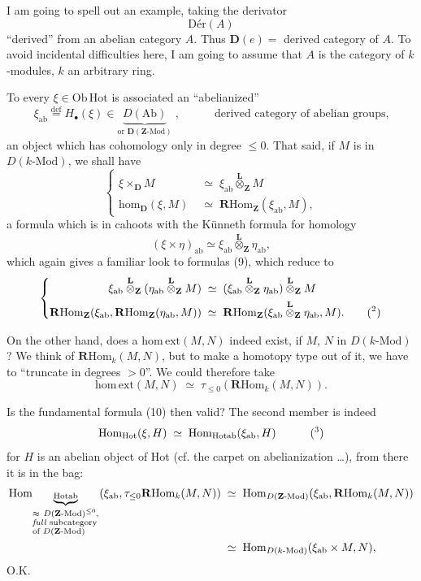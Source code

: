 \documentclass[11pt]{article}
\newcommand{\printedpage}[1]{\marginpar{\footnotesize p.~#1}}
\newcommand{\msp}[1]{\marginpar{\footnotesize [#1]}}
\newcommand{\D}{\mathbf{D}}
\newcommand{\Hot}{\mathrm{Hot}}
\newcommand{\Hom}{\mathrm{Hom}}
\newcommand{\hm}{\mathrm{hom}}
\newcommand{\homext}{\mathrm{hom}\,\mathrm{ext}}
\newcommand{\Ob}{\mathrm{Ob}\,}
\newcommand{\Ltens}{\overset{\mathbf{L}}{\otimes}}
\newcommand{\RHom}{\mathbf{R}\mathrm{Hom}}
\newcommand{\ab}{\mathrm{ab}}
\newcommand{\defeq}{\overset{\text{def}}{=}}
\begin{document}
I am going to spell out an example, taking the derivator
\[
\mathrm{Dér}(A)
\]
``derived'' from an abelian category $A$. Thus $\D(e)=$ derived category of $A$. To avoid
\msp{page 11}
incidental difficulties here, I am going to assume that $A$ is the category of $k$-modules, $k$ an arbitrary ring.

To every $\xi\in\Ob\Hot$ is associated an ``abelianized''
\[
\xi_{\ab}\defeq H_{\bullet}(\xi)\in\underbrace{D(\mathrm{Ab})}_{\text{or }\mathbf{D}(\mathbf{Z}\text{-Mod})}\;,\qquad\quad\text{derived category of abelian groups,}
\]
an object which has cohomology only in degree $\le 0$. That said, if $M$ is in $D(k\text{-Mod})$, we shall have
\[
\left\{
\begin{aligned}
\xi\times_{\D}M &\;\simeq\;\xi_{\ab}\Ltens_{\mathbf{Z}}M\\
\hm_{\D}(\xi,M) &\;\simeq\;\RHom_{\mathbf{Z}}(\xi_{\ab},M),
\end{aligned}
\right.
\tag*{(15)}
\]
a formula which is in cahoots with the Künneth formula for homology
\[
(\xi\times\eta)_{\ab}\simeq\xi_{\ab}\Ltens_{\mathbf{Z}}\eta_{\ab},
\tag*{(16)}
\]
which again gives a familiar look to formulas (9), which reduce to
\[
\left\{
\begin{aligned}
\xi_{\ab}\Ltens_{\mathbf{Z}}(\eta_{\ab}\Ltens_{\mathbf{Z}}M) &\;\simeq\;(\xi_{\ab}\Ltens_{\mathbf{Z}}\eta_{\ab})\Ltens_{\mathbf{Z}}M\\
\RHom_{\mathbf{Z}}(\xi_{\ab},\RHom_{\mathbf{Z}}(\eta_{\ab},M)) &\;\simeq\;\RHom_{\mathbf{Z}}(\xi_{\ab}\Ltens_{\mathbf{Z}}\eta_{\ab},M).\qquad\text{(\footnotemark[2])}
\end{aligned}
\right.
\]

On the other hand, does a $\homext(M,N)$ indeed exist, if $M$, $N$ in $D(k\text{-Mod})$? We think of $\RHom_k(M,N)$, but to make a homotopy type out of it, we have to ``truncate in degrees $>0$''. We could therefore take
\[
\homext(M,N)\;\simeq\;\tau_{\le 0}(\RHom_k(M,N)).
\]

\printedpage{8}
\msp{page 12}
Is the fundamental formula (10) then valid? The second member is indeed
\[
\Hom_{\Hot}(\xi,H)\;\simeq\;\Hom_{\mathrm{Hotab}}(\xi_{\ab},H)\qquad\quad\text{(\footnotemark[3])}
\]
for $H$ is an abelian object of Hot (cf. the carpet on abelianization \ldots), from there it is in the bag:
\[
\begin{aligned}
\Hom_{\underbrace{\scriptstyle\mathrm{Hotab}}_{\begin{subarray}{l}\approx\ D(\mathbf{Z}\text{-Mod})^{\le 0},\\ \text{\textit{full} subcategory}\\ \text{of }D(\mathbf{Z}\text{-Mod})\end{subarray}}}(\xi_{\ab},\tau_{\le 0}\RHom_k(M,N)) &\;\simeq\;\Hom_{D(\mathbf{Z}\text{-Mod})}(\xi_{\ab},\RHom_k(M,N))\\
&\;\simeq\;\Hom_{D(k\text{-Mod})}(\xi_{\ab}\times M,N),
\end{aligned}
\]
O.K.
\end{document}
